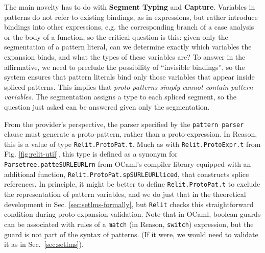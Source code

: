 \documentclass[acmsmall]{acmart}
\newcommand{\li}[1]{\lstinline[basicstyle=\ttfamily\fontsize{9pt}{1em}\selectfont]{#1}}
\begin{document}
The main novelty has to do with \textbf{Segment Typing} and \textbf{Capture}. Variables in patterns do not refer to existing bindings, as in expressions, but rather introduce bindings into other expressions, e.g. the corresponding branch of a case analysis or the body of a function, so the critical question is this: given only the segmentation of a pattern literal, can we determine exactly which variables the expansion binds, and what the types of these variables are? To answer in the affirmative, we need to preclude the possibility of ``invisible bindings'', so the system ensures that pattern literals bind only those variables that appear inside spliced patterns. This implies that \emph{proto-patterns simply cannot contain pattern variables}. The segmentation assigns a type to each spliced segment, so the question just asked can be answered given only the segmentation.

From the provider's perspective, the parser specified by the \li{pattern parser} clause must generate a proto-pattern, rather than a proto-expression. In Reason, this is a value of type \li{Relit.ProtoPat.t}. Much as with \li{Relit.ProtoExpr.t} from Fig. \ref{fig:relit-util}, this type is defined as a synonym for \li{Parsetree.patteSURLEURLrn} from OCaml's compiler library equipped with an additional function, \li{Relit.ProtoPat.spSURLEURLliced}, that constructs splice references. In principle, it might be better to define \li{Relit.ProtoPat.t} to exclude the representation of pattern variables, and we do just that in the theoretical development in Sec. \ref{sec:setlms-formally}, but \li{Relit} checks this straightforward condition during proto-expansion validation. Note that in OCaml, boolean guards can be associated with rules of a \li{match} (in Reason, \li{switch}) expression, but the guard is not part of the syntax of patterns. (If it were, we would need to validate it as in Sec.~\ref{sec:setlms}). %
\end{document}
